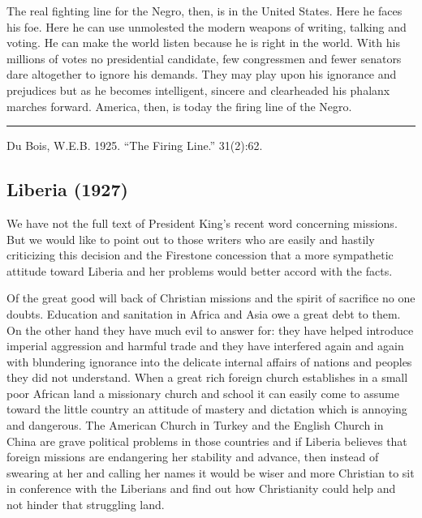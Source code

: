 \documentclass[letterpaper,10pt,english]{jupyterBook}
\begin{document}
\sphinxAtStartPar
The real fighting line for the Negro, then, is in the United States. Here he faces his foe. Here he can use unmolested the modern weapons of writing, talking and voting. He can make the world listen because he is right in the world. With his millions of votes no presidential candidate, few congressmen and fewer senators dare altogether to ignore his demands. They may play upon his ignorance and prejudices but as he becomes intelligent, sincere and clear\sphinxhyphen{}headed his phalanx marches forward. America, then, is today the firing line of the Negro.


\bigskip\hrule\bigskip


\sphinxAtStartPar
{} Du Bois, W.E.B. 1925. “The Firing Line.”  31(2):62.


\subsection{Liberia (1927)}
\label{\detokenize{Volumes/34/01/liberia:liberia-1927}}\label{\detokenize{Volumes/34/01/liberia::doc}}
\sphinxAtStartPar
We have not the full text of President King’s recent word concerning missions. But we would like to point out to those writers who are easily and hastily criticizing this decision and the Firestone concession that a more sympathetic attitude toward Liberia and her problems would better accord with the facts.

\sphinxAtStartPar
Of the great good will back of Christian missions and the spirit of sacrifice no one doubts. Education and sanitation in Africa and Asia owe a great debt to them. On the other hand they have much evil to answer for: they have helped introduce imperial aggression and harmful trade and they have interfered again and again with blundering ignorance into the delicate internal affairs of nations and peoples they did not understand. When a great rich foreign church establishes in a small poor African land a missionary church and school it can easily come to assume toward the little country an attitude of mastery and dictation which is annoying and dangerous. The American Church in Turkey and the English Church in China are grave political problems in those countries and if Liberia believes that foreign missions are endangering her stability and advance, then instead of swearing at her and calling her names it would be wiser and more Christian to sit in conference with the Liberians and find out how Christianity could help and not hinder that struggling land.
\end{document}
